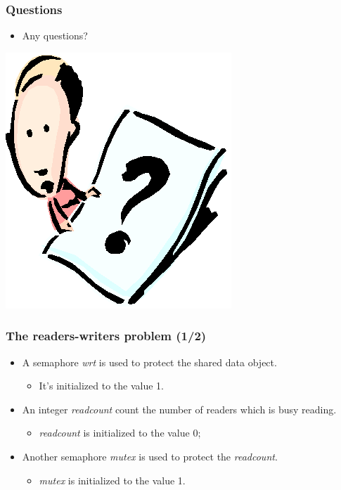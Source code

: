 \documentclass[CJKutf8,xcolor=pdftex,dvipsnames,table]{beamer}
\begin{document}
\begin{CJK*}{UTF8}{song}
  \begin{frame}
  \frametitle{Questions}
  \begin{itemize}
  \item{Any questions?}
  \end{itemize}
  \begin{center}
    \includegraphics[scale=.5]{question}
  \end{center}
  \end{frame}

  \begin{frame}
  \frametitle{The readers-writers problem (1/2)} \pause
  \begin{itemize}
  \item{A semaphore \emph{wrt} is used to protect the shared data object.} \pause
    \begin{itemize}
    \item{It's initialized to the value 1.} \pause
    \end{itemize}
  \item{An integer \emph{readcount} count the number of readers which is busy reading.} \pause
    \begin{itemize}
    \item{\emph{readcount} is initialized to the value 0;} \pause
    \end{itemize}
  \item{Another semaphore \emph{mutex} is used to protect the \emph{readcount}.} \pause
    \begin{itemize}
    \item{\emph{mutex} is initialized to the value 1.}
    \end{itemize}
  \end{itemize}
  \end{frame}


\end{CJK*}
\end{document}
